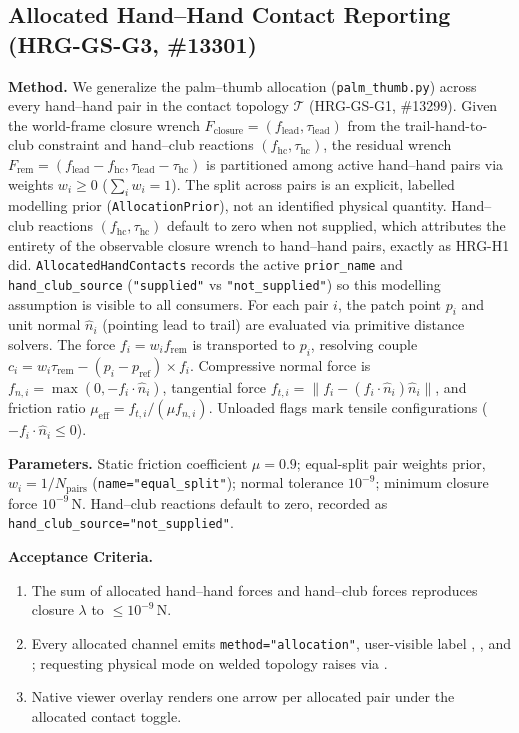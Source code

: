 \documentclass[11pt,a4paper]{article}
\begin{document}
\subsection{Allocated Hand--Hand Contact Reporting (HRG-GS-G3, \#13301)}
\textbf{Method.} We generalize the palm--thumb allocation (\texttt{palm\_thumb.py})
across every hand--hand pair in the contact topology $\mathcal{T}$ (HRG-GS-G1,
\#13299). Given the world-frame closure wrench $F_{\mathrm{closure}} =
(f_{\mathrm{lead}}, \tau_{\mathrm{lead}})$ from the trail-hand-to-club
constraint and hand--club reactions $(f_{\mathrm{hc}}, \tau_{\mathrm{hc}})$,
the residual wrench $F_{\mathrm{rem}} = (f_{\mathrm{lead}} -
f_{\mathrm{hc}}, \tau_{\mathrm{lead}} - \tau_{\mathrm{hc}})$ is
partitioned among active hand--hand pairs via weights $w_i \ge 0$ ($\sum_i w_i =
1$). The split across pairs is an explicit, labelled modelling prior
(\texttt{AllocationPrior}), not an identified physical quantity. Hand--club reactions
$(f_{\mathrm{hc}}, \tau_{\mathrm{hc}})$ default to zero when not supplied, which attributes
the entirety of the observable closure wrench to hand--hand pairs, exactly as HRG-H1 did.
\texttt{AllocatedHandContacts} records the active \texttt{prior\_name} and
\texttt{hand\_club\_source} (\texttt{"supplied"} vs \texttt{"not\_supplied"}) so this
modelling assumption is visible to all consumers. For each pair $i$, the patch point $p_i$
and unit normal $\hat{n}_i$ (pointing lead to trail) are evaluated via primitive distance
solvers. The force $f_i = w_i f_{\mathrm{rem}}$ is transported to $p_i$, resolving
couple $c_i = w_i \tau_{\mathrm{rem}} - (p_i - p_{\mathrm{ref}})
\times f_i$. Compressive normal force is $f_{n,i} = \max(0, -f_i \cdot
\hat{n}_i)$, tangential force $f_{t,i} = \|f_i - (f_i \cdot
\hat{n}_i)\hat{n}_i\|$, and friction ratio $\mu_{\mathrm{eff}} =
f_{t,i}/(\mu f_{n,i})$. Unloaded flags mark tensile configurations ($-f_i
\cdot \hat{n}_i \le 0$).

\textbf{Parameters.} Static friction coefficient $\mu = 0.9$; equal-split pair
weights prior, $w_i = 1/N_{\mathrm{pairs}}$ (\texttt{name="equal\_split"});
normal tolerance $10^{-9}$; minimum closure force $10^{-9}$\,N.  Hand--club
reactions default to zero, recorded as
\texttt{hand\_club\_source="not\_supplied"}.

\textbf{Acceptance Criteria.}
\begin{enumerate}[leftmargin=*,noitemsep]
\item The sum of allocated hand--hand forces and hand--club forces reproduces closure
$\lambda$ to $\le 10^{-9}$\,N.
\item Every allocated channel emits \texttt{method="allocation"}, user-visible
label , , and
; requesting physical mode on welded
topology raises  via .
\item Native viewer overlay renders one arrow per allocated pair under the allocated
contact toggle.
\end{enumerate}
\end{document}

